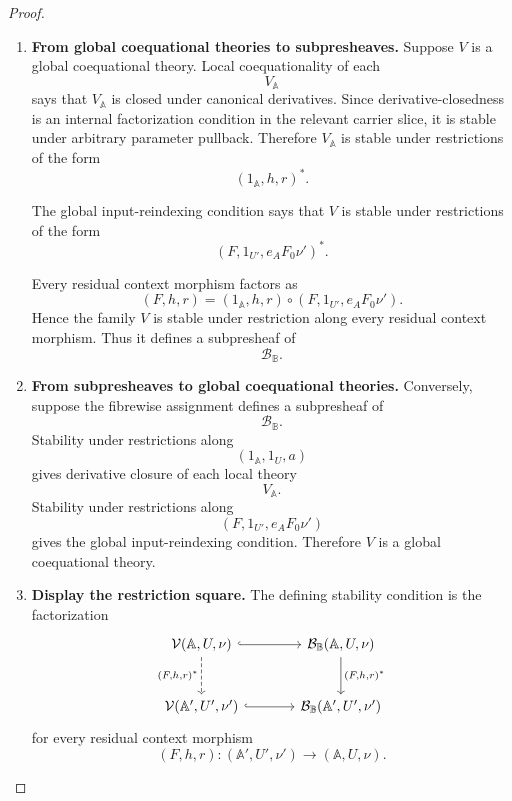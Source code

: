 \begin{proof}
    \leavevmode
    \begin{enumerate}
        \item \textbf{From global coequational theories to subpresheaves.}
        Suppose \(V\) is a global coequational theory. Local coequationality of
        each
        \[
            V_{\mathbb A}
        \]
        says that \(V_{\mathbb A}\) is closed under canonical derivatives.
        Since derivative-closedness is an internal factorization condition in
        the relevant carrier slice, it is stable under arbitrary parameter
        pullback. Therefore \(V_{\mathbb A}\) is stable under restrictions of
        the form
        \[
            (1_{\mathbb A},h,r)^*.
        \]

        The global input-reindexing condition says that \(V\) is stable under
        restrictions of the form
        \[
            (F,1_{U'},e_AF_0\nu')^*.
        \]

        Every residual context morphism factors as
        \[
            (F,h,r)
            =
            (1_{\mathbb A},h,r)
            \circ
            (F,1_{U'},e_AF_0\nu').
        \]
        Hence the family \(V\) is stable under restriction along every residual
        context morphism. Thus it defines a subpresheaf of
        \[
            \mathcal B_{\mathbb B}.
        \]

        \item \textbf{From subpresheaves to global coequational theories.}
        Conversely, suppose the fibrewise assignment defines a subpresheaf of
        \[
            \mathcal B_{\mathbb B}.
        \]
        Stability under restrictions along
        \[
            (1_{\mathbb A},1_U,a)
        \]
        gives derivative closure of each local theory
        \[
            V_{\mathbb A}.
        \]
        Stability under restrictions along
        \[
            (F,1_{U'},e_AF_0\nu')
        \]
        gives the global input-reindexing condition. Therefore \(V\) is a
        global coequational theory.

        \item \textbf{Display the restriction square.}
        The defining stability condition is the factorization
        \[
        \begin{tikzcd}[column sep=large, row sep=large]
            \mathcal V(\mathbb A,U,\nu)
                \arrow[r, hook]
                \arrow[d, dashed, "{(F,h,r)^*}"']
            &
            \mathcal B_{\mathbb B}(\mathbb A,U,\nu)
                \arrow[d, "{(F,h,r)^*}"]
            \\
            \mathcal V(\mathbb A',U',\nu')
                \arrow[r, hook]
            &
            \mathcal B_{\mathbb B}(\mathbb A',U',\nu')
        \end{tikzcd}
        \]
        for every residual context morphism
        \[
            (F,h,r):
            (\mathbb A',U',\nu')
            \to
            (\mathbb A,U,\nu).
        \]
    \end{enumerate}
\end{proof}

